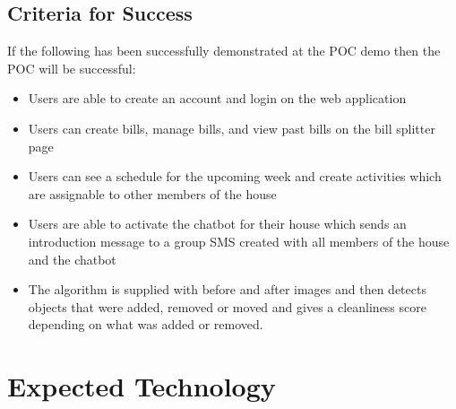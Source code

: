 \documentclass[12pt, titlepage]{article}
\begin{document}
\subsection{Criteria for Success}
If the following has been successfully demonstrated at the POC demo then the POC will be successful:
\begin{itemize}
\item Users are able to create an account and login on the web application
\item Users can create bills, manage bills, and view past bills on the bill splitter page
\item Users can see a schedule for the upcoming week and create activities which are assignable to other members of the house
\item Users are able to activate the chatbot for their house which sends an introduction message to a group SMS created with all members of the house and the chatbot
\item The algorithm is supplied with before and after images and then detects objects that were added, removed or moved and gives a cleanliness score depending on what was added or removed.
\end{itemize}
\section{Expected Technology}
\end{document}
